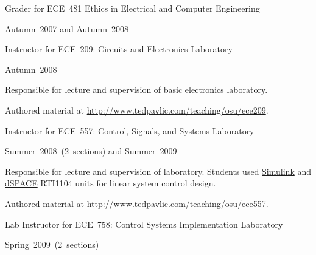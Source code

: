 \documentclass[10pt]{article}           %
\newcommand{\halfblankline}{\quad\vspace{-0.5\baselineskip}\pagebreak[3]}
\begin{document}
\begin{cvlist}[loose]
\begin{cvlist}
        \item Grader for ECE~481 Ethics in Electrical and Computer Engineering
        \begin{cvlist}
            \item Autumn~2007 and Autumn~2008
        \end{cvlist}

        \halfblankline

        \item Instructor for ECE~209: Circuits and Electronics
            Laboratory
        \begin{cvlist}
            \item Autumn~2008


            \item Responsible for lecture and supervision of basic
                electronics laboratory.

            \item Authored material at
                \url{http://www.tedpavlic.com/teaching/osu/ece209}.
        \end{cvlist}

        \halfblankline

        \item Instructor for ECE~557: Control, Signals, and Systems
            Laboratory
        \begin{cvlist}
            \item Summer~2008~(2~sections) and Summer~2009


            \item Responsible for lecture and supervision of laboratory.
                Students used
                \href{http://www.mathworks.com/products/simulink/}{Simulink}
                and \href{http://www.dspaceinc.com/}{dSPACE} RTI1104
                units for linear system control design.

            \item Authored material at
                \url{http://www.tedpavlic.com/teaching/osu/ece557}.
        \end{cvlist}

        \halfblankline

        \item Lab Instructor for ECE~758: Control Systems Implementation
            Laboratory
        \begin{cvlist}
            \item Spring~2009~(2~sections)


\end{cvlist}
\end{cvlist}
\end{cvlist}
\end{document}
